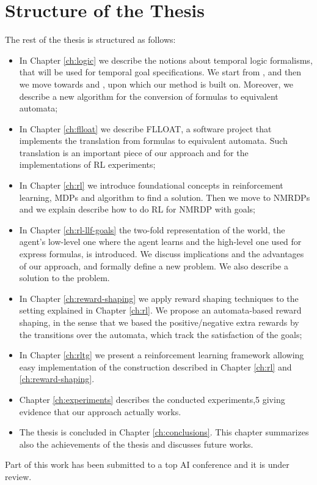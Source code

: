 \section{Structure of the Thesis}\label{sect:intro-structure-thesis}
The rest of the thesis is structured as follows:
\begin{itemize}
	\item In Chapter \ref{ch:logic} we describe the notions about temporal logic formalisms, that will be used for temporal goal specifications. We start from \LTL, \REGEX and then we move towards \LTLf and \LDLf, upon which our method is built on. Moreover, we describe a new algorithm for the conversion of \LLf formulas to equivalent automata;
	\item In Chapter \ref{ch:flloat} we describe FLLOAT, a software project that implements the translation from \LLf formulas to equivalent automata. Such translation is an important piece of our approach and for the implementations of RL experiments;
	\item In Chapter \ref{ch:rl} we introduce foundational concepts in reinforcement learning, MDPs and algorithm to find a solution. Then we move to NMRDPs and we explain describe how to do RL for NMRDP with \LLf goals;
	\item In Chapter \ref{ch:rl-llf-goals} the two-fold representation of the world, the agent's low-level one where the agent learns and the high-level one used for express \LLf formulas, is introduced. We discuss implications and the advantages of our approach, and formally define a new problem. We also describe a solution to the problem.
	\item In Chapter \ref{ch:reward-shaping} we apply reward shaping techniques to the setting explained in Chapter \ref{ch:rl}. We propose an automata-based reward shaping, in the sense that we based the positive/negative extra rewards by the transitions over the automata, which track the satisfaction of the \LLf goals;
	\item In Chapter \ref{ch:rltg} we present a reinforcement learning framework allowing easy implementation of the construction described in Chapter \ref{ch:rl} and \ref{ch:reward-shaping}.
	\item Chapter \ref{ch:experiments} describes the conducted experiments,5 giving evidence that our approach actually works.
	\item The thesis is concluded in Chapter \ref{ch:conclusions}. This chapter summarizes also the achievements of
	the thesis and discusses future works.
\end{itemize}
Part of this work has been submitted to a top AI conference and it is under review.